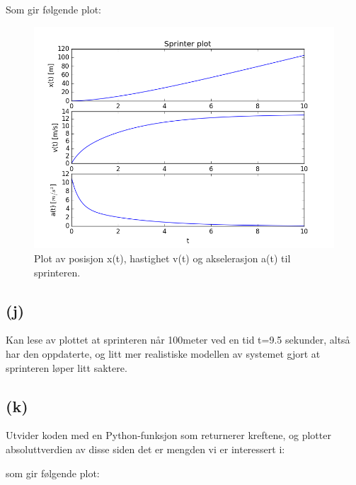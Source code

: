 \documentclass[a4paper,norsk,12pt]{article}
\begin{document}
\noindent
Som gir følgende plot:


\begin{figure}[H]

  \includegraphics[width=\linewidth]{sprinter03.png}

  \caption{Plot av posisjon x(t), hastighet v(t) og akselerasjon a(t) til sprinteren.}

  \label{fig:plot5}

\end{figure}

\noindent
\subsection*{(j)}

\noindent
Kan lese av plottet at sprinteren når 100meter ved en tid t=9.5 sekunder, altså har den oppdaterte, og litt mer realistiske modellen av systemet gjort at sprinteren løper litt saktere.\\

\noindent
\subsection*{(k)}

\noindent
Utvider koden med en Python-funksjon som returnerer kreftene, og plotter absoluttverdien av disse siden det er mengden vi er interessert i:



\noindent
som gir følgende plot:
\end{document}
